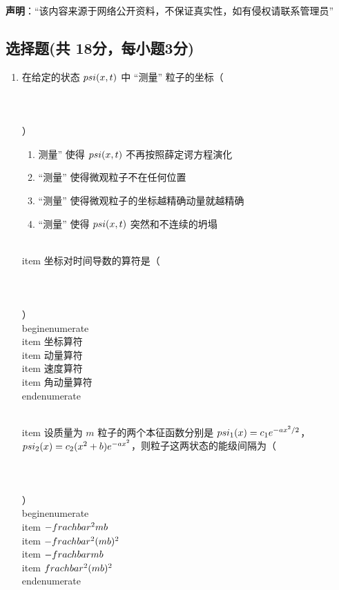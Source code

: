 
\textbf{声明}：“该内容来源于网络公开资料，不保证真实性，如有侵权请联系管理员”

\subsection{选择题(共 18分，每小题3分)}
\begin{enumerate}
\item  在给定的状态 $\\psi(x,t)$ 中 “测量” 粒子的坐标（\\ \\ \\ \\ ）
    \begin{enumerate}
    \item 测量” 使得 $\\psi(x,t)$ 不再按照薛定谔方程演化
    \item “测量” 使得微观粒子不在任何位置
    \item “测量” 使得微观粒子的坐标越精确动量就越精确
    \item “测量” 使得 $\\psi(x,t)$ 突然和不连续的坍塌
    \end{enumerate}
    
\\item  坐标对时间导数的算符是（\\ \\ \\ \\ ）
    \\begin{enumerate}
    \\item 坐标算符 
    \\item 动量算符 
    \\item 速度算符 
    \\item 角动量算符
    \\end{enumerate}
    
\\item  设质量为 $m$ 粒子的两个本征函数分别是 $\\psi_1(x) = c_1e^{-ax^2/2}$，$\\psi_2(x) = c_2(x^2+b)e^{-ax^2}$，则粒子这两状态的能级间隔为（\\ \\ \\ \\ ）
    \\begin{enumerate}
    \\item $-\\frac{\\hbar^2}{mb}$
    \\item $-\\frac{\\hbar^2}{(mb)^2}$
    \\item $-\\frac{\\hbar}{mb}$
    \\item $\\frac{\\hbar^2}{(mb)^2}$
    \\end{enumerate}


\end{enumerate}
